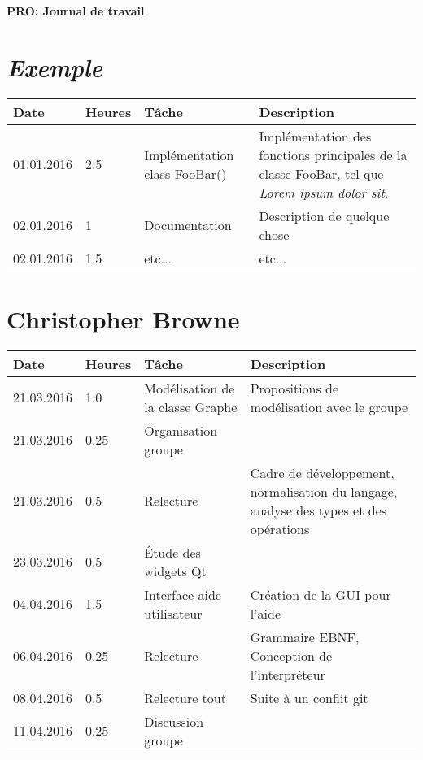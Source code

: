 \documentclass[french]{article}
\begin{document}
	\centering
	\large{\textbf{PRO: Journal de travail}}
	
	\justify
	
	\section*{\huge \textit{Exemple}}
	\begin{tabular}{p{}|p{}|p{}|p{}}
		Date&Heures&Tâche&Description\\
		\hline
		01.01.2016&2.5&Implémentation class FooBar()&Implémentation des fonctions principales de la classe FooBar, tel que \textit{Lorem ipsum dolor sit}.\\
		\hline
		02.01.2016&1&Documentation&Description de quelque chose\\
		\hline
		02.01.2016&1.5&etc...&etc...
	\end{tabular}
	
	\section*{Christopher Browne}
	\begin{tabular}{p{}|p{}|p{}|p{}}
		Date&Heures&Tâche&Description\\
		\hline \hline
		21.03.2016 & 1.0 & Modélisation de la classe Graphe & Propositions de modélisation avec le groupe \\
		21.03.2016 & 0.25 & Organisation groupe & \\
		21.03.2016 & 0.5 & Relecture & Cadre de développement, normalisation du langage, analyse des types et des opérations \\
		23.03.2016 & 0.5 & Étude des widgets Qt & \\
		04.04.2016 & 1.5 & Interface aide utilisateur & Création de la GUI pour l'aide \\
		06.04.2016 & 0.25 & Relecture & Grammaire EBNF, Conception de l'interpréteur\\
		08.04.2016 & 0.5 & Relecture tout & Suite à un conflit git\\
		11.04.2016 & 0.25 & Discussion groupe & \\
	\end{tabular}
	
\end{document}
